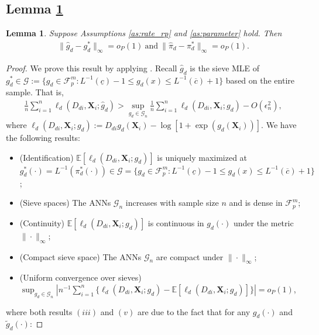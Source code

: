 \documentclass[11pt]{article}
\newtheorem{lemma}[thm]{Lemma}
\numberwithin{equation}{section}
\begin{document}
{
	\subsection{Lemma \ref{claim:uc}}
	\begin{lemma} \label{claim:uc}
		Suppose  Assumptions \ref{as:rate_rp} and \ref{as:parameter} hold. Then
		\begin{align*}
			\|\widehat{g}_d-g_d^*\|_{\infty}=o_P(1) \ \text{and} \ \|\widehat{\pi}_d-\pi_d^*\|_{\infty}=o_P(1).
		\end{align*}
	\end{lemma}
	\begin{proof}
		We prove this result by applying  \citet[Theorem 3.1]{chen2007large}.
		Recall $\widehat{g}_d$ is the sieve MLE  of $g_d^*\in \mathcal{G}:=\{g_d\in\mathcal{F}^m_p:L^{-1}(\underline{c})-1\leq g_d(x)\leq L^{-1}(\overline{c})+1 \}$ based on the entire sample. That is,
		\begin{align*}
			\frac{1}{n}\sum_{i=1}^n\ell_d(D_{di},\boldsymbol{X}_{i};\widehat{g}_d)>\sup_{g_d\in\mathcal{G}_n}\frac{1}{n}\sum_{i=1}^n\ell_d(D_{di},\boldsymbol{X}_{i};{g}_d)-O(\epsilon_n^2),
		\end{align*}
		where $\ell_d(D_{di},\boldsymbol{X}_{i};g_d):=D_{di}g_d(\boldsymbol{X}_i)-\log\left[1+\exp(g_d(\boldsymbol{X}_i))\right]$. We have the following results:
		\begin{itemize}
			\item [(i)] (Identification) $\mathbb{E}[\ell_d(D_{di},\boldsymbol{X}_{i};g_d)]$ is uniquely maximized at $g^*_{d}(\cdot)=L^{-1}\left(\pi_d^*(\cdot)\right)\in \mathcal{G}=\{g_d\in\mathcal{F}^m_p:L^{-1}(\underline{c})-1\leq g_d(x)\leq L^{-1}(\overline{c})+1 \}$;
			\item [(ii)] (Sieve spaces) The ANNs $\mathcal{G}_n$ increases with sample size $n$ and is dense in $\mathcal{F}_p^m$;
			\item [(iii)] (Continuity) $\mathbb{E}[\ell_d(D_{di},\boldsymbol{X}_{i};g_d)]$ is continuous in $g_d(\cdot)$ under the metric $\|\cdot\|_{\infty}$;
			\item [(iv)] (Compact sieve space) The ANNs $\mathcal{G}_n$ are compact under $\|\cdot\|_{\infty}$;
			\item [(v)] (Uniform convergence over sieves) $\sup_{g_d\in\mathcal{G}_n}|n^{-1}\sum_{i=1}^n\{\ell_d(D_{di},\boldsymbol{X}_{i};g_d)-\mathbb{E}[\ell_d(D_{di},\boldsymbol{X}_{i};g_d)]\}|=o_P(1)$,
		\end{itemize}
		where both results $(iii)$ and $(v)$ are due to the fact that for any $g_d(\cdot)$ and $\widetilde{g}_d(\cdot)$:

\end{proof}}
\end{document}
